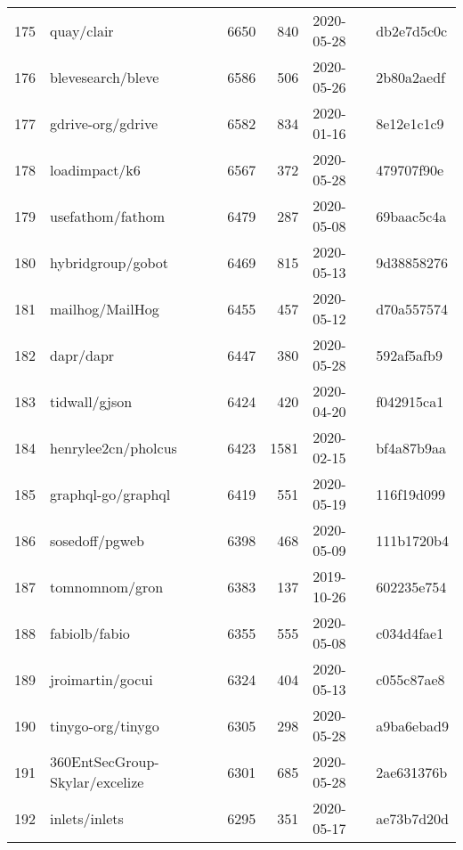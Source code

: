 \begin{longtable}{llrrll}
    175 &                                         quay/clair &   6650 &    840 & 2020-05-28 &  db2e7d5c0c \\
    176 &                                  blevesearch/bleve &   6586 &    506 & 2020-05-26 &  2b80a2aedf \\
    177 &                                  gdrive-org/gdrive &   6582 &    834 & 2020-01-16 &  8e12e1c1c9 \\
    178 &                                      loadimpact/k6 &   6567 &    372 & 2020-05-28 &  479707f90e \\
    179 &                                   usefathom/fathom &   6479 &    287 & 2020-05-08 &  69baac5c4a \\
    180 &                                  hybridgroup/gobot &   6469 &    815 & 2020-05-13 &  9d38858276 \\
    181 &                                    mailhog/MailHog &   6455 &    457 & 2020-05-12 &  d70a557574 \\
    182 &                                          dapr/dapr &   6447 &    380 & 2020-05-28 &  592af5afb9 \\
    183 &                                      tidwall/gjson &   6424 &    420 & 2020-04-20 &  f042915ca1 \\
    184 &                                henrylee2cn/pholcus &   6423 &   1581 & 2020-02-15 &  bf4a87b9aa \\
    185 &                                 graphql-go/graphql &   6419 &    551 & 2020-05-19 &  116f19d099 \\
    186 &                                     sosedoff/pgweb &   6398 &    468 & 2020-05-09 &  111b1720b4 \\
    187 &                                     tomnomnom/gron &   6383 &    137 & 2019-10-26 &  602235e754 \\
    188 &                                      fabiolb/fabio &   6355 &    555 & 2020-05-08 &  c034d4fae1 \\
    189 &                                   jroimartin/gocui &   6324 &    404 & 2020-05-13 &  c055c87ae8 \\
    190 &                                  tinygo-org/tinygo &   6305 &    298 & 2020-05-28 &  a9ba6ebad9 \\
    191 &                     360EntSecGroup-Skylar/excelize &   6301 &    685 & 2020-05-28 &  2ae631376b \\
    192 &                                      inlets/inlets &   6295 &    351 & 2020-05-17 &  ae73b7d20d \\

\end{longtable}

